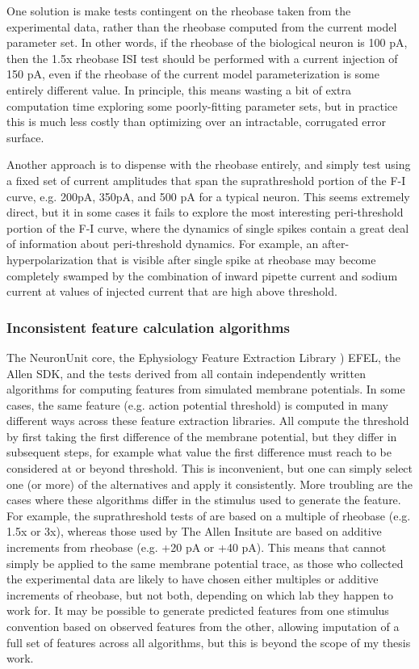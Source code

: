 One solution is make tests contingent on the rheobase taken from the experimental data, rather than the rheobase computed from the current model parameter set.
In other words, if the rheobase of the biological neuron is 100 pA, then the 1.5x rheobase ISI test should be performed with a current injection of 150 pA, even if the rheobase of the current model parameterization is some entirely different value.
In principle, this means wasting a bit of extra computation time exploring some poorly-fitting parameter sets, but in practice this is much less costly than optimizing over an intractable, corrugated error surface.

Another approach is to dispense with the rheobase entirely, and simply test using a fixed set of current amplitudes that span the suprathreshold portion of the F-I curve, e.g. 200pA, 350pA, and 500 pA for a typical neuron.
This seems extremely direct, but it in some cases it fails to explore the most interesting peri-threshold portion of the F-I curve, where the dynamics of single spikes contain a great deal of information about peri-threshold dynamics.
For example, an after-hyperpolarization that is visible after single spike at rheobase may become completely swamped by the combination of inward pipette current and sodium current at values of injected current that are high above threshold.

\subsubsection{Inconsistent feature calculation algorithms}
The NeuronUnit core, the Ephysiology Feature Extraction Library \cite{EFEL}) EFEL, the Allen SDK, and the tests derived from \cite{druckmann2008evaluating} all contain independently written algorithms for computing features from simulated membrane potentials.
In some cases, the same feature (e.g. action potential threshold) is computed in many different ways across these feature extraction libraries.
All compute the threshold by first taking the first difference of the membrane potential, but they differ in subsequent steps, for example what value the first difference must reach to be considered at or beyond threshold.
This is inconvenient, but one can simply select one (or more) of the alternatives and apply it consistently.
More troubling are the cases where these algorithms differ in the stimulus used to generate the feature.
For example, the suprathreshold tests of \cite{druckmann2008evaluating} are based on a multiple of rheobase (e.g. 1.5x or 3x), whereas those used by The Allen Insitute are based on additive increments from rheobase (e.g. +20 pA or +40 pA).
This means that cannot simply be applied to the same membrane potential trace, as those who collected the experimental data are likely to have chosen either multiples or additive increments of rheobase, but not both, depending on which lab they happen to work for.
It may be possible to generate predicted features from one stimulus convention based on observed features from the other, allowing imputation of a full set of features across all algorithms, but this is beyond the scope of my thesis work.


